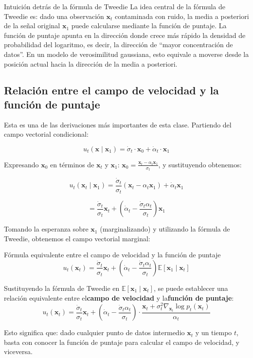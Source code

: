 \documentclass[a4paper]{article}
\begin{document}
\begin{knowledgebox}{Intuición detrás de la fórmula de Tweedie}
La idea central de la fórmula de Tweedie es: dado una observación $\mathbf{x}_t$ contaminada con ruido, la media a posteriori de la señal original $\mathbf{x}_1$ puede calcularse mediante la función de puntaje. La función de puntaje apunta en la dirección donde crece más rápido la densidad de probabilidad del logaritmo, es decir, la dirección de ``mayor concentración de datos''. En un modelo de verosimilitud gaussiana, esto equivale a moverse desde la posición actual hacia la dirección de la media a posteriori.
\end{knowledgebox}

\subsection{Relación entre el campo de velocidad y la función de puntaje}

Esta es una de las derivaciones más importantes de esta clase. Partiendo del campo vectorial condicional:

$$u_t(\mathbf{x} \mid \mathbf{x}_1) = \dot{\sigma}_t \cdot \mathbf{x}_0 + \dot{\alpha}_t \cdot \mathbf{x}_1$$

Expresando $\mathbf{x}_0$ en términos de $\mathbf{x}_t$ y $\mathbf{x}_1$: $\mathbf{x}_0 = \frac{\mathbf{x}_t - \alpha_t \mathbf{x}_1}{\sigma_t}$, y sustituyendo obtenemos:

$$u_t(\mathbf{x}_t \mid \mathbf{x}_1) = \frac{\dot{\sigma}_t}{\sigma_t}(\mathbf{x}_t - \alpha_t \mathbf{x}_1) + \dot{\alpha}_t \mathbf{x}_1$$

$$= \frac{\dot{\sigma}_t}{\sigma_t} \mathbf{x}_t + \left(\dot{\alpha}_t - \frac{\dot{\sigma}_t \alpha_t}{\sigma_t}\right) \mathbf{x}_1$$

Tomando la esperanza sobre $\mathbf{x}_1$ (marginalizando) y utilizando la fórmula de Tweedie, obtenemos el campo vectorial marginal:

\begin{importantbox}{Fórmula equivalente entre el campo de velocidad y la función de puntaje}
$$u_t(\mathbf{x}_t) = \frac{\dot{\sigma}_t}{\sigma_t} \mathbf{x}_t + \left(\dot{\alpha}_t - \frac{\dot{\sigma}_t \alpha_t}{\sigma_t}\right) \mathbb{E}[\mathbf{x}_1 \mid \mathbf{x}_t]$$

Sustituyendo la fórmula de Tweedie en $\mathbb{E}[\mathbf{x}_1 \mid \mathbf{x}_t]$, se puede establecer una relación equivalente entre el\textbf{campo de velocidad} y la\textbf{función de puntaje}:
$$u_t(\mathbf{x}_t) = \frac{\dot{\sigma}_t}{\sigma_t} \mathbf{x}_t + \left(\dot{\alpha}_t - \frac{\dot{\sigma}_t \alpha_t}{\sigma_t}\right) \cdot \frac{\mathbf{x}_t + \sigma_t^2 \nabla_{\mathbf{x}_t} \log p_t(\mathbf{x}_t)}{\alpha_t}$$

Esto significa que: dado cualquier punto de datos intermedio $\mathbf{x}_t$ y un tiempo $t$, basta con conocer la función de puntaje para calcular el campo de velocidad, y viceversa.
\end{importantbox}
\end{document}
